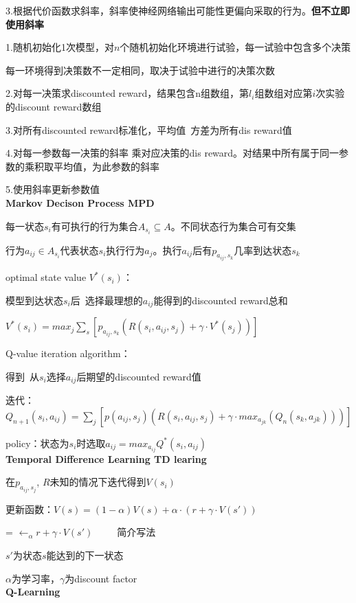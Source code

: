\documentclass[UTF8]{ctexart}
\begin{document}
  \quad \quad 3.根据代价函数求斜率，斜率使神经网络输出可能性更偏向采取的行为。\textbf{但不立即使用斜率}

  \quad 1.随机初始化1次模型，对$n$个随机初始化环境进行试验，每一试验中包含多个决策
  
  \quad \quad 每一环境得到决策数不一定相同，取决于试验中进行的决策次数

  \quad 2.对每一决策求discounted reward，结果包含n组数组，第$l_i$组数组对应第$i$次实验的discount reward数组

  \quad 3.对所有discounted reward标准化，平均值\ 方差为所有dis reward值
  
  \quad 4.对每一参数每一决策的斜率 乘对应决策的dis reward。对结果中所有属于同一参数的乘积取平均值，为此参数的斜率

  \quad 5.使用斜率更新参数值\\
\textbf{Markov Decison Process MPD}

  每一状态$s_i$有可执行的行为集合$A_{s_i} \subseteq A$。不同状态行为集合可有交集

  行为$a_{ij} \in A_{s_i}$代表状态$s_i$执行行为$a_j$。执行$a_{ij}$后有$p_{a_{ij}, s_k}$几率到达状态$s_k$

  optimal state value $V^*(s_i)$：
  
  \quad 模型到达状态$s_i$后\ 选择最理想的$a_{ij}$能得到的discounted reward总和

  \quad $V^*(s_i) = max_j \sum_s [p_{a_{ij}, s_k} (R(s_i, a_{ij}, s_j) + \gamma \cdot V^*(s_j))]$
  
  Q-value iteration algorithm：

  \quad 得到\ 从$s_i$选择$a_{ij}$后期望的discounted reward值

  \quad 迭代：$Q_{n+1}(s_i, a_{ij}) = \sum_j [p(a_{ij}, s_j) (R(s_i, a_{ij}, s_j) + \gamma \cdot max_{a_{jk}} (Q_n(s_k, a_{jk})))]$
  
  policy：状态为$s_i$时选取$a_{ij} = max_{a_{ij}} Q^*(s_i, a_{ij})$\\
\textbf{Temporal Difference Learning TD learing}

  在$p_{a_{ij}, s_j}$, $R$未知的情况下迭代得到$V(s_i)$
  
  更新函数：$V(s) = (1-\alpha)V(s) + \alpha \cdot (r + \gamma \cdot V(s'))$
  
  \quad = $\leftarrow_{\alpha} r + \gamma \cdot V(s') $\ \ \ \ \ 简介写法
  
  \quad $s'$为状态$s$能达到的下一状态
  
  \quad $\alpha$为学习率，$\gamma$为discount factor\\
\textbf{Q-Learning}
\end{document}
